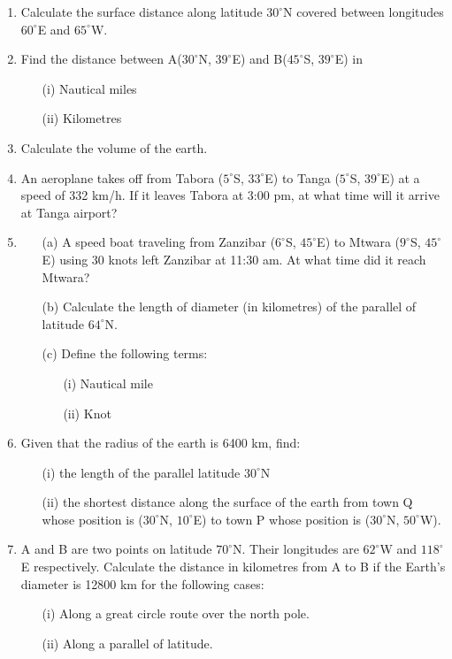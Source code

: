 \begin{enumerate}
	\item Calculate the surface distance along latitude $30^\circ$N covered between longitudes $60^\circ$E and $65^\circ$W.
	
	\item Find the distance between A($30^\circ$N, $39^\circ$E) and B($45^\circ$S, $39^\circ$E) in
		\begin{itemize}
		\item[(i)] Nautical miles
		\item[(ii)] Kilometres
		\end{itemize}
		
	\item Calculate the volume of the earth.
	
	\item An aeroplane takes off from Tabora ($5^\circ$S, $33^\circ$E) to Tanga ($5^\circ$S, $39^\circ$E) at a speed of 332 km\slash h. If it leaves Tabora at 3:00 pm, at what time will it arrive at Tanga airport?
	
	\item 
		\begin{itemize}
		\item[(a)] A speed boat traveling from Zanzibar ($6^\circ$S, $45^\circ$E) to Mtwara ($9^\circ$S, $45^\circ$E) using 30 knots left Zanzibar at 11:30 am. At what time did it reach Mtwara?
		\item[(b)] Calculate the length of diameter (in kilometres) of the parallel of latitude $64^\circ$N.
		\item[(c)] Define the following terms:
			\begin{itemize}
			\item[(i)] Nautical mile
			\item[(ii)] Knot
			\end{itemize}
		\end{itemize}
		
	\item Given that the radius of the earth is 6400 km, find:
		\begin{itemize}
		\item[(i)] the length of the parallel latitude $30^\circ$N
		\item[(ii)] the shortest distance along the surface of the earth from town Q whose position is ($30^\circ$N, $10^\circ$E) to town P whose position is ($30^\circ$N, $50^\circ$W).
		\end{itemize}

	\item A and B are two points on latitude $70^\circ$N. Their longitudes are $62^\circ$W and $118^\circ$E respectively. Calculate the distance in kilometres from A to B if the Earth's diameter is 12800 km for the following cases:
		\begin{itemize}
		\item[(i)] Along a great circle route over the north pole.
		\item[(ii)] Along a parallel of latitude.
		\end{itemize}
		

\end{enumerate}
